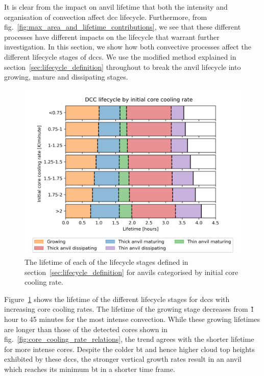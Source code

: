 It is clear from the impact on anvil lifetime that both the intensity and organisation of convection affect \acrshort{dcc} lifecycle.
Furthermore, from fig.~\ref{fig:max_area_and_lifetime_contributions}, we see that these different processes have different impacts on the lifecycle that warrant further investigation.
In this section, we show how both convective processes affect the different lifecycle stages of \acrshort{dcc}s.
We use the modified \citeauthor{futyan_deep_2007} method explained in section~\ref{sec:lifecycle_definition} throughout to break the anvil lifecycle into growing, mature and dissipating stages.

\begin{figure}[tp]
    \centering
    \includegraphics[width=\textwidth]{figures/chapter3_09.png}
    \caption[
    The average lifetime of each lifecycle stage for anvils categorised by initial core cooling rate
    ]{
    The lifetime of each of the lifecycle stages defined in section~\ref{sec:lifecycle_definition} for anvils categorised by initial core cooling rate.
    }
    \label{fig:anvil_cooling_rate_absolute_lifecycle}
\end{figure}

Figure~\ref{fig:anvil_cooling_rate_absolute_lifecycle} shows the lifetime of the different lifecycle stages for \acrshort{dcc}s with increasing core cooling rates.
The lifetime of the growing stage decreases from \~1 hour to 45 minutes for the most intense convection.
While these growing lifetimes are longer than those of the detected cores shown in fig.~\ref{fig:core_cooling_rate_relations}, the trend agrees with the shorter lifetime for more intense cores.
Despite the colder \acrshort{bt} and hence higher cloud top heights exhibited by these \acrshort{dcc}s, the stronger vertical growth rates result in an anvil which reaches its minimum \acrshort{bt} in a shorter time frame.

